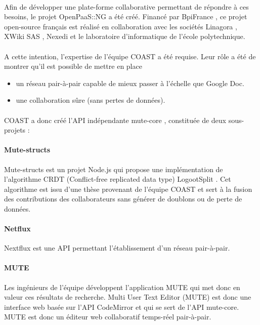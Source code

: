 \documentclass[12pt]{article}
\begin{document}
\paragraph{}
Afin de développer une plate-forme collaborative permettant de répondre à ces besoins, le projet OpenPaaS::NG \cite{openpaas} a été créé. Financé par BpiFrance \cite{bpi}, ce projet open-source français est réalisé en collaboration avec les sociétés Linagora \cite{linagora}, XWiki SAS \cite{xwiki}, Nexedi \cite{nexedi} et le laboratoire d'informatique de l'école polytechnique.
\paragraph{}
A cette intention, l'expertise de l'équipe COAST a été requise. Leur rôle a été de montrer qu'il est possible de mettre en place
\begin{itemize}
    \item un réseau pair-à-pair capable de mieux passer à l'échelle que Google Doc.
    \item une collaboration sûre (sans pertes de données).
\end{itemize}
\paragraph{}
COAST a donc créé l'API indépendante mute-core \cite{mute-core}, constituée de deux sous-projets :

\paragraph{Mute-structs}
Mute-structs \cite{mute-structs} est un projet Node.js qui propose une implémentation de l'algorithme CRDT (Conflict-free replicated data type) LogootSplit \cite{logoot}. Cet algorithme est issu d'une thèse provenant de l'équipe COAST et sert à la fusion des contributions des collaborateurs sans générer de doublons ou de perte de données.

\paragraph{Netflux}
Nextflux \cite{netflux} est une API permettant l'établissement d'un réseau pair-à-pair.

\paragraph{MUTE}
Les ingénieurs de l'équipe développent l'application MUTE qui met donc en valeur ces résultats de recherche. Multi User Text Editor (MUTE) est donc une interface web basée sur l'API CodeMirror et qui se sert de l'API mute-core. MUTE est donc un éditeur web collaboratif temps-réel pair-à-pair.
\end{document}
